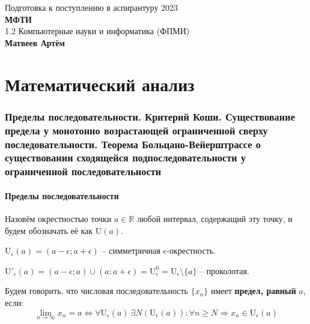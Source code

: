 \documentclass{article}
\begin{document}
\begin{titlepage}
	\centering
	\vspace*{\fill} %
	\Huge{Подготовка к поступлению в аспирантуру 2023} \\
	\Large{\textbf{МФТИ}} \\
	\Large{1.2 Компьютерные науки и информатика (ФПМИ)} \\
	\vspace{2em} %
	\Large\textbf{Матвеев Артём}
	\vspace*{\fill} %
	\newpage
\end{titlepage}
\setcounter{page}{2}

\part*{Математический анализ}

\section*{Пределы последовательности. Критерий Коши. Существование предела у монотонно возрастающей ограниченной сверху последовательности. Теорема Больцано-Вейерштрассе о существовании сходящейся подпоследовательности у ограниченной последовательности}

\subsection*{Пределы последовательности}

Назовём окрестностью точки $a \in \mathbb R$ любой интервал, содержащий эту точку, и будем обозначать её как $\mathrm{U}(a)$.

$\mathrm{U}_{\epsilon}(a) = (a - \epsilon; a + \epsilon)$ -- симметричная $\epsilon$-окрестность.

$\mathrm{U}'_{\epsilon}(a) = (a - \epsilon; a) \cup (a; a + \epsilon) = \mathrm{U}^0_{\epsilon} = \mathrm{U}_{\epsilon} \setminus \{a\}$ -- проколотая.

Будем говорить, что числовая последовательность $\{x_n\}$ имеет \textbf{предел, равный} $a$, если:
\begin{equation}\label{eq:lim1}
	\lim_{n \to \infty} x_n = a \Leftrightarrow \forall \mathrm{U}_{\epsilon}(a)\ \exists N (\mathrm{U}_{\epsilon}(a)) \colon \forall n \ge N \Rightarrow x_n \in \mathrm{U}_{\epsilon}(a)
\end{equation}
\end{document}
